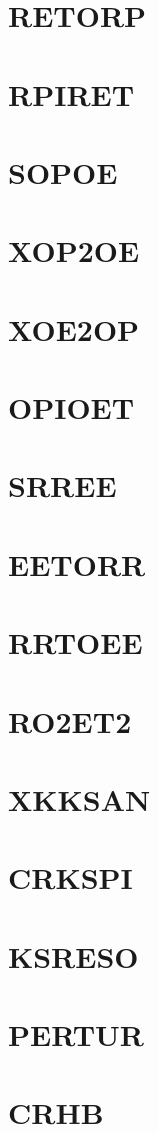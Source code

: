 \documentclass[10pt,UTF8]{ctexbook}
\begin{document}
\section{RETORP}
\section{RPIRET}
\section{SOPOE}
\section{XOP2OE}
\section{XOE2OP}
\section{OPIOET}
\section{SRREE}
\section{EETORR}
\section{RRTOEE}
\section{RO2ET2}
\section{XKKSAN}
\section{CRKSPI}
\section{KSRESO}
\section{PERTUR}
\section{CRHB}
\end{document}
